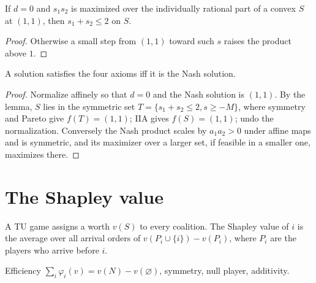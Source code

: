 \begin{lemma}
\label{lem:sum-le-two}
\leanok
If $d = 0$ and $s_1 s_2$ is maximized over the individually rational part of a convex $S$ at $(1,1)$, then
$s_1 + s_2 \le 2$ on $S$.
\end{lemma}
\begin{proof}
\leanok
Otherwise a small step from $(1,1)$ toward such $s$ raises the product above $1$.
\end{proof}

\begin{theorem}
\label{thm:nash-bargaining}
\leanok
{}
A solution satisfies the four axioms iff it is the Nash solution.
\end{theorem}
\begin{proof}
\leanok
Normalize affinely so that $d = 0$ and the Nash solution is $(1,1)$. By the lemma, $S$ lies in the symmetric set
$T = \{s_1 + s_2 \le 2, s \ge -M\}$, where symmetry and Pareto give $f(T) = (1,1)$; IIA gives $f(S) = (1,1)$; undo
the normalization. Conversely the Nash product scales by $a_1 a_2 > 0$ under affine maps and is symmetric, and its
maximizer over a larger set, if feasible in a smaller one, maximizes there.
\end{proof}

\section{The Shapley value}

\begin{definition}
\label{def:shapley}
\leanok
A TU game assigns a worth $v(S)$ to every coalition. The Shapley value of $i$ is the average over all arrival
orders of $v(P_i \cup \{i\}) - v(P_i)$, where $P_i$ are the players who arrive before $i$.
\end{definition}

\begin{definition}
\label{def:shapley-axioms}
\leanok
{}
Efficiency $\sum_i \varphi_i(v) = v(N) - v(\varnothing)$, symmetry, null player, additivity.
\end{definition}


